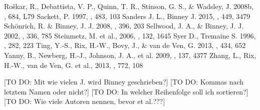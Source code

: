 \documentclass[12pt,preprint]{aastex}
\begin{document}
\begin{thebibliography}{}
 Ro\v{s}kar, R., Debattista, V. P., Quinn, T. R., Stinson, G. S., \& Wadsley, J. 2008b, \apj, 684, L79
 Sackett, P. 1997, \apj, 483, 103
 Sanders J. L., Binney J. 2015, \mnras, 449, 3479
 Sch\"{o}nrich, R. \& Binney, J. J. 2008, \mnras, 396, 203
 Sellwood, J. A., \& Binney, J. J. 2002, \mnras, 336, 785
 Steinmetz, M. et al., 2006, \aj, 132, 1645
 Syer D., Tremaine S. 1996, \mnras, 282, 223
 Ting, Y.-S., Rix, H.-W., Bovy, J., \& van de Ven, G. 2013, \mnras, 434, 652
 Yanny, B., Newberg, H.-J., Johnson, J. A., et al. 2009, \aj, 137, 4377 
 Zhang, L., Rix, H.-W., van de Ven, G. et al., 2013, \apj, 772, 108
\end{thebibliography}

[TO DO: Mit wie vielen J. wird Binney geschrieben?] [TO DO: Kommas nach letztem Namen oder nicht?] [TO DO: In welcher Reihenfolge soll ich sortieren?] [TO DO: Wie viele Autoren nennen, bevor et al.???]
\end{document}

